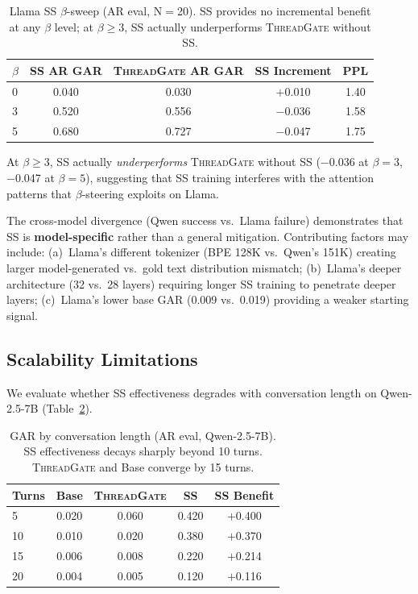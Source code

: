 \documentclass[11pt]{article}
\newcommand{\gar}{\textsc{GAR}}
\newcommand{\tg}{\textsc{ThreadGate}}
\renewcommand{\ss}{\textsc{SS}}
\begin{document}
\begin{table}[t]
\centering
\small
\caption{Llama SS $\beta$-sweep (AR eval, N$=$20). SS provides no incremental benefit at any $\beta$ level; at $\beta \geq 3$, SS actually underperforms \tg{} without SS.}
\label{tab:llama_beta}
\begin{tabular}{lcccc}
\toprule
$\beta$ & \textbf{SS AR \gar{}} & \textbf{\tg{} AR \gar{}} & \textbf{SS Increment} & \textbf{PPL} \\
\midrule
0 & 0.040 & 0.030 & $+$0.010 & 1.40 \\
3 & 0.520 & 0.556 & $-$0.036 & 1.58 \\
5 & 0.680 & 0.727 & $-$0.047 & 1.75 \\
\bottomrule
\end{tabular}
\end{table}

At $\beta \geq 3$, SS actually \emph{underperforms} \tg{} without SS ($-$0.036 at $\beta=3$, $-$0.047 at $\beta=5$), suggesting that SS training interferes with the attention patterns that $\beta$-steering exploits on Llama.

The cross-model divergence (Qwen success vs.\ Llama failure) demonstrates that SS is \textbf{model-specific} rather than a general mitigation. Contributing factors may include: (a)~Llama's different tokenizer (BPE 128K vs.\ Qwen's 151K) creating larger model-generated vs.\ gold text distribution mismatch; (b)~Llama's deeper architecture (32 vs.\ 28 layers) requiring longer SS training to penetrate deeper layers; (c)~Llama's lower base \gar{} (0.009 vs.\ 0.019) providing a weaker starting signal.

\subsection{Scalability Limitations}
\label{sec:long_conv}

We evaluate whether SS effectiveness degrades with conversation length on Qwen-2.5-7B (Table~\ref{tab:long_conv}).

\begin{table}[t]
\centering
\small
\caption{\gar{} by conversation length (AR eval, Qwen-2.5-7B). SS effectiveness decays sharply beyond 10 turns. \tg{} and Base converge by 15 turns.}
\label{tab:long_conv}
\begin{tabular}{lcccc}
\toprule
\textbf{Turns} & \textbf{Base} & \textbf{\tg{}} & \textbf{\ss{}} & \textbf{SS Benefit} \\
\midrule
5 & 0.020 & 0.060 & 0.420 & $+$0.400 \\
10 & 0.010 & 0.020 & 0.380 & $+$0.370 \\
15 & 0.006 & 0.008 & 0.220 & $+$0.214 \\
20 & 0.004 & 0.005 & 0.120 & $+$0.116 \\
\bottomrule
\end{tabular}
\end{table}
\end{document}
